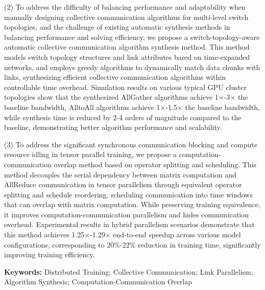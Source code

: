 (2) To address the difficulty of balancing performance and adaptability when manually designing collective communication algorithms for multi-level switch topologies, and the challenge of existing automatic synthesis methods in balancing performance and solving efficiency, we propose a switch-topology-aware automatic collective communication algorithm synthesis method. This method models switch topology structures and link attributes based on time-expanded networks, and employs greedy algorithms to dynamically match data chunks with links, synthesizing efficient collective communication algorithms within controllable time overhead. Simulation results on various typical GPU cluster topologies show that the synthesized AllGather algorithms achieve 1$\times$-3$\times$ the baseline bandwidth, AlltoAll algorithms achieve 1$\times$-1.5$\times$ the baseline bandwidth, while synthesis time is reduced by 2-4 orders of magnitude compared to the baseline, demonstrating better algorithm performance and scalability.

(3) To address the significant synchronous communication blocking and compute resource idling in tensor parallel training, we propose a computation-communication overlap method based on operator splitting and scheduling. This method decouples the serial dependency between matrix computation and AllReduce communication in tensor parallelism through equivalent operator splitting and schedule reordering, scheduling communication into time windows that can overlap with matrix computation. While preserving training equivalence, it improves computation-communication parallelism and hides communication overhead. Experimental results in hybrid parallelism scenarios demonstrate that this method achieves 1.25$\times$-1.29$\times$ end-to-end speedup across various model configurations, corresponding to 20\%-22\% reduction in training time, significantly improving training efficiency.

\noindent \textbf{Keywords:} Distributed Training; Collective Communication; Link Parallelism; Algorithm Synthesis; Computation-Communication Overlap